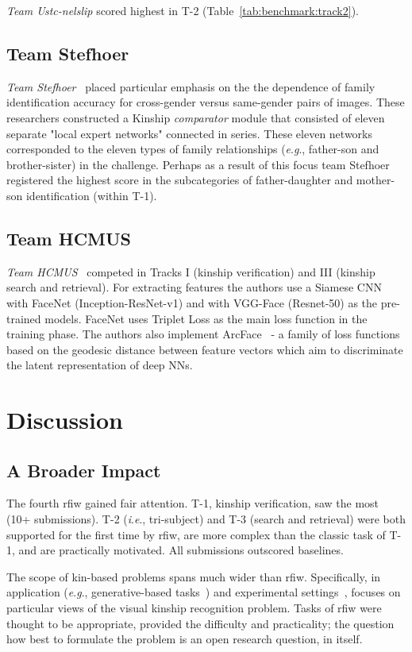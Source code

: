 \documentclass[letterpaper, 10 pt, conference]{ieeeconf}
\newcommand{\ie}{\textit{i}.\textit{e}., }
\newcommand{\eg}{\textit{e}.\textit{g}., }
\begin{document}
\emph{Team Ustc-nelslip} scored highest in T-2 (Table~\ref{tab:benchmark:track2}). 

\subsection{Team Stefhoer}
\emph{Team Stefhoer}~\cite{id2} placed particular emphasis on the the dependence of family identification accuracy for cross-gender versus same-gender pairs of images. These researchers constructed a Kinship \emph{comparator} module that consisted of eleven separate "local expert networks" connected in series. These eleven networks corresponded to the eleven types of family relationships (\eg father-son and brother-sister) in the challenge. Perhaps as a result of this focus team Stefhoer registered the highest score in the subcategories of father-daughter and mother-son identification (within T-1).

\subsection{Team HCMUS}
\emph{Team HCMUS}~\cite{id9} competed in Tracks I (kinship verification) and III (kinship search and retrieval). For extracting features the authors use a Siamese CNN with FaceNet (Inception-ResNet-v1) and with VGG-Face (Resnet-50) as the pre-trained models. FaceNet uses Triplet Loss as the main loss function in the training phase. The authors also implement ArcFace~\cite{deng2019arcface} - a family of loss functions based on the geodesic distance between feature vectors which aim to discriminate the latent representation of deep NNs. 


\acresetall
\section{Discussion}\label{sec:discussion}
\subsection{A Broader Impact}
The fourth \ac{rfiw} gained fair attention. 
T-1, kinship verification, saw the most (10+ submissions). T-2 (\ie tri-subject) and T-3 (search and retrieval) were both supported for the first time by \ac{rfiw}, are more complex than the classic task of T-1, and are practically motivated. All submissions outscored baselines. 


The scope of kin-based problems spans much wider than \ac{rfiw}. Specifically, in application (\eg generative-based tasks~\cite{gao2019will, ozkan2018kinshipgan}) and experimental settings~\cite{mingaaai2020}, focuses on particular views of the visual kinship recognition problem. Tasks of \ac{rfiw} were thought to be appropriate, provided the difficulty and practicality; the question how best to formulate the problem is an open research question, in itself. 
\end{document}
